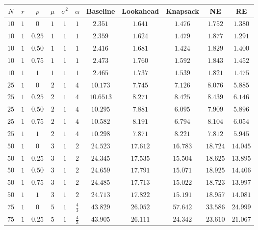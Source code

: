 \documentclass[12pt]{scrartcl}
\begin{document}
\begin{figure}[H]
\centering
 \begin{longtable}{|c|c|c|c|c|c|c|c|c|c|c|} 
 \hline
 $N$ & $r$ & $p$ & $\mu$ & $\sigma^2$ & $\alpha$ & Baseline & Lookahead & Knapsack & NE & RE \\
 \hline 
  $10$ & $1$ & $0$ & $1$ & $1$ & $1$ & $2.351$ & $1.641$ & $1.476$ & $1.752$ & $1.380$\\ 
 \hline
 $10$ & $1$ & $0.25$ & $1$ & $1$ & $1$ & $2.359$ & $1.624$ & $1.479$ & $1.877$ & $1.291$ \\
 \hline
 $10$ & $1$ & $0.50$ & $1$ & $1$ & $1$ & $2.416$ & $1.681$ & $1.424$ & $1.829$ & $1.400$ \\
 \hline
 $10$ & $1$ & $0.75$ & $1$ & $1$ & $1$ & $2.473$ & $1.760$ & $1.592$ & $1.843$ & $1.452$ \\
 \hline
 $10$ & $1$ & $1$ & $1$ & $1$ & $1$ & $2.465$ & $1.737$ & $1.539$ & $1.821$ & $1.475$ \\ 
 \hline
 $25$ & $1$ & $0$ & $2$ & $1$ & $4$ & $10.173$ & $7.745$ & $7.126$ & $8.076$ & $5.885$ \\
 \hline
 $25$ & $1$ & $0.25$ & $2$ & $1$ & $4$ & $10.6513$ & $8.271$ & $8.425$ & $8.439$ & $6.146$ \\
 \hline
 $25$ & $1$ & $0.50$ & $2$ & $1$ & $4$ & $10.295$ & $7.881$ & $6.095$ & $7.909$ & $5.896$ \\
 \hline
 $25$ & $1$ & $0.75$ & $2$ & $1$ & $4$ & $10.582$ & $8.191$ & $6.794$ & $8.104$ & $6.054$ \\
 \hline
 $25$ & $1$ & $1$ & $2$  & $1$ & $4$ & $10.298$ & $7.871$ & $8.221$ & $7.812$ & $5.945$ \\
 \hline
 $50$ & $1$ & $0$ & $3$ & $1$ & $2$ & $24.523$ & $17.612$ & $16.783$ & $18.724$ & $14.045$ \\
 \hline
 $50$ & $1$ & $0.25$ & $3$ & $1$ & $2$ & $24.345$ & $17.535$ & $15.504$ & $18.625$ & $13.895$ \\
 \hline
 $50$ & $1$ & $0.50$ & $3$ & $1$ & $2$ & $24.659$ & $17.791$ & $15.071$ & $18.925$ & $14.406$ \\
 \hline
 $50$ & $1$ & $0.75$ & $3$ & $1$ & $2$ & $24.485$ & $17.713$ & $15.022$ & $18.723$ & $13.997$ \\
 \hline
 $50$ & $1$ & $1$ & $3$ & $1$ & $2$ & $24.713$ & $17.822$ & $15.191$ & $18.957$ & $14.081$ \\
 \hline
 $75$ & $1$ & $0$ & $5$ & $1$ & $\frac{4}{3}$ & $43.829$ & $26.052$ & $57.642$ & $33.586$ & $24.999$ \\
 \hline
 $75$ & $1$ & $0.25$ & $5$ & $1$ & $\frac{4}{3}$ & $43.905$ & $26.111$ & $24.342$ & $23.610$ & $21.067$ \\

\end{longtable}
\end{figure}
\end{document}

